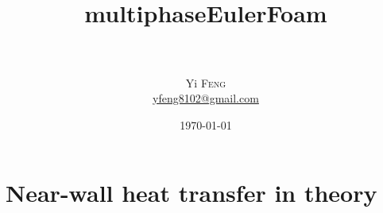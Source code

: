 \documentclass{article}
\title{
        \horrule{2pt} \\[0.5cm] %
        \Huge{multiphaseEulerFoam}\\
        \horrule{2pt} \\[0.5cm] %
        } %
\author{
        \Large{Yi \textsc{Feng}}\\
        \href{mailto:yfeng8102@gmail.com}{yfeng8102@gmail.com}
        } %
\date{\today} %
\begin{document}
\maketitle %
\thispagestyle{empty}

\cleardoublepage
{}
\tableofcontents %


\cleardoublepage
{}

\section{Near-wall heat transfer in theory}








\end{document}
